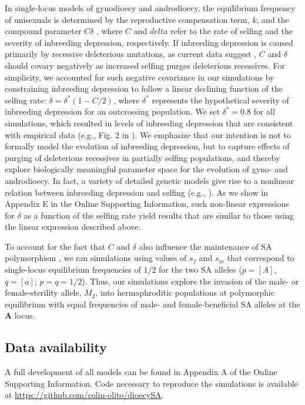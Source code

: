\documentclass{article}
\begin{document}
In single-locus models of gynodioecy and androdioecy, the equilibrium frequency of unisexuals is determined by the reproductive compensation term, $k$, and the compound parameter $C \delta$ \citep{Charlesworth1978a}, where $C$ and $delta$ refer to the rate of selfing and the severity of inbreeding depression, respectively. If inbreeding depression is caused primarily by recessive deleterious mutations, as current data suggest \citep{Charlesworth2009}, $C$ and $\delta$ should covary negatively as increased selfing purges deleterious recessives. For simplicity, we accounted for such negative covariance in our simulations by constraining inbreeding depression to follow a linear declining function of the selfing rate: $\delta = \delta^\ast(1 - C/2)$, where $\delta^\ast$ represents the hypothetical severity of inbreeding depression for an outcrossing population. We set $\delta^\ast = 0.8$ for all simulations, which resulted in levels of inbreeding depression that are consistent with empirical data (e.g., Fig. 2 in \citealt{HusbandSchemske1996}). We emphasize that our intention is not to formally model the evolution of inbreeding depression, but to capture effects of purging of deleterious recessives in partially selfing populations, and thereby explore biologically meaningful parameter space for the evolution of gyno- and androdioecy. In fact, a variety of detailed genetic models give rise to a nonlinear relation between inbreeding depression and selfing (e.g., \citealt{OhtaCockerham1974, LandeSchemske1985, Charlesworth1985, Garcia-Dorado2017, LandePorcher2017}). As we show in Appendix E in the Online Supporting Information, such non-linear expressions for $\delta$ as a function of the selfing rate yield results that are similar to those using the linear expression described above. 

To account for the fact that $C$ and $\delta$ also influence the maintenance of SA polymorphism \citep{JordanConnallon2014,Olito2016}, we ran simulations using values of $s_f$ and $s_m$ that correspond to single-locus equilibrium frequencies of $1/2$ for the two SA alleles ($p = [A]$, $q = [a]$; $p=q=1/2$). Thus, our simulations explore the invasion of the male- or female-sterility allele, $M_2$, into hermaphroditic populations at polymorphic equilibrium with equal frequencies of male- and female-beneficial SA alleles at the $\mathbf{A}$ locus.


\subsection*{Data availability}
A full development of all models can be found in Appendix A of the Online Supporting Information. Code necessary to reproduce the simulations is available at \url{https://github.com/colin-olito/dioecySA}.
\end{document}
